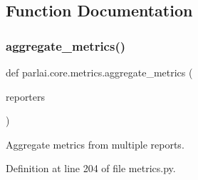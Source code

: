 \subsection{Function Documentation}
\mbox{\label{namespaceparlai_1_1core_1_1metrics_aa4ed5491962e06684b235fffe1b20fec}} 
\subsubsection{\texorpdfstring{aggregate\+\_\+metrics()}{aggregate\_metrics()}}
{\footnotesize\ttfamily def parlai.\+core.\+metrics.\+aggregate\+\_\+metrics (\begin{DoxyParamCaption}\item[{}]{reporters }\end{DoxyParamCaption})}

\begin{DoxyVerb}Aggregate metrics from multiple reports.
\end{DoxyVerb}
 

Definition at line 204 of file metrics.\+py.


